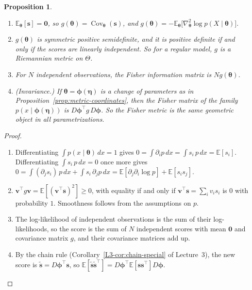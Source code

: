 \documentclass[11pt]{article}
\newcommand{\E}{\mathbb{E}}
\theoremstyle{definition}
\theoremstyle{plain}
\newtheorem{proposition}[definition]{Proposition}
\theoremstyle{remark}
\DeclareMathOperator{\Cov}{Cov}
\begin{document}
\begin{proposition}\label{prop:fisher}
    \begin{enumerate}
        \item $\E_{\boldsymbol{\theta}}[\mathbf{s}] = \mathbf{0}$, so $g(\boldsymbol{\theta}) = \Cov_{\boldsymbol{\theta}}(\mathbf{s})$, and $g(\boldsymbol{\theta}) = -\E_{\boldsymbol{\theta}}\big[\nabla^2_{\boldsymbol{\theta}}\log p(X \mid \boldsymbol{\theta})\big]$.
        \item $g(\boldsymbol{\theta})$ is symmetric positive semidefinite, and it is positive definite if and only if the scores are linearly independent. So for a regular model, $g$ is a Riemannian metric on $\Theta$.
        \item For $N$ independent observations, the Fisher information matrix is $Ng(\boldsymbol{\theta})$.
        \item (Invariance.) If $\boldsymbol{\theta} = \boldsymbol{\phi}(\boldsymbol{\eta})$ is a change of parameters as in Proposition~\ref{prop:metric-coordinates}, then the Fisher matrix of the family $p(x \mid \boldsymbol{\phi}(\boldsymbol{\eta}))$ is $D\boldsymbol{\phi}^\top g\,D\boldsymbol{\phi}$. So the Fisher metric is the same geometric object in all parametrizations.
    \end{enumerate}
\end{proposition}

\begin{proof}
    \begin{enumerate}
        \item Differentiating $\int p(x \mid \boldsymbol{\theta})\, dx = 1$ gives $0 = \int \partial_ip\, dx = \int s_i\,p\, dx = \E[s_i]$. Differentiating $\int s_i\,p\, dx = 0$ once more gives $0 = \int (\partial_js_i)\,p\, dx + \int s_i\,\partial_jp\, dx = \E[\partial_j\partial_i\log p] + \E[s_is_j]$.
        \item $\mathbf{v}^\top g\mathbf{v} = \E[(\mathbf{v}^\top\mathbf{s})^2] \geq 0$, with equality if and only if $\mathbf{v}^\top\mathbf{s} = \sum_i v_is_i$ is $0$ with probability $1$. Smoothness follows from the assumptions on $p$.
        \item The log-likelihood of independent observations is the sum of their log-likelihoods, so the score is the sum of $N$ independent scores with mean $\mathbf{0}$ and covariance matrix $g$, and their covariance matrices add up.
        \item By the chain rule (Corollary~\ref{L3-cor:chain-special} of Lecture~3), the new score is $\tilde{\mathbf{s}} = D\boldsymbol{\phi}^\top\mathbf{s}$, so $\E[\tilde{\mathbf{s}}\tilde{\mathbf{s}}^\top] = D\boldsymbol{\phi}^\top\E[\mathbf{s}\mathbf{s}^\top]D\boldsymbol{\phi}$. \qedhere
    \end{enumerate}
\end{proof}
\end{document}
